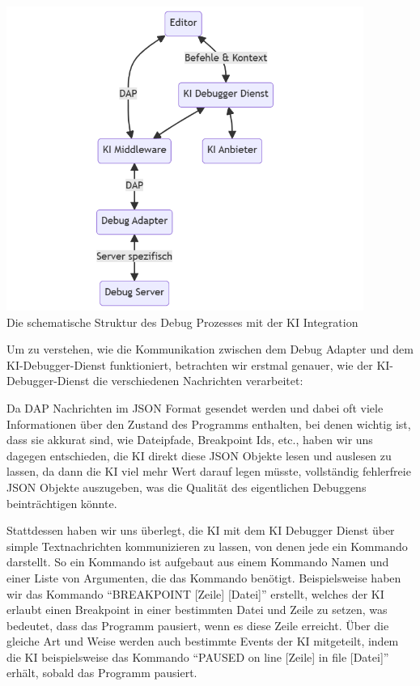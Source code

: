 \documentclass[a4paper,12pt,ngerman]{scrartcl}
\begin{document}
\begin{center}	
	\includegraphics[width=0.875\textwidth]{ai_integration}\\
	\small{Die schematische Struktur des Debug Prozesses mit der KI Integration}
\end{center}

Um zu verstehen, wie die Kommunikation zwischen dem Debug Adapter und dem KI-Debugger-Dienst funktioniert, betrachten wir erstmal genauer, wie der KI-Debugger-Dienst die verschiedenen Nachrichten verarbeitet:

Da DAP Nachrichten im JSON Format gesendet werden und dabei oft viele Informationen über den Zustand des Programms enthalten, bei denen wichtig ist, dass sie akkurat sind, wie Dateipfade, Breakpoint Ids, etc., haben wir uns dagegen entschieden, die KI direkt diese JSON Objekte lesen und auslesen zu lassen, da dann die KI viel mehr Wert darauf legen müsste, vollständig fehlerfreie JSON Objekte auszugeben, was die Qualität des eigentlichen Debuggens beinträchtigen könnte.

Stattdessen haben wir uns überlegt, die KI mit dem KI Debugger Dienst über simple Textnachrichten kommunizieren zu lassen, von denen jede ein Kommando darstellt. So ein Kommando ist aufgebaut aus einem Kommando Namen und einer Liste von Argumenten, die das Kommando benötigt. Beispielsweise haben wir das Kommando ``BREAKPOINT [Zeile] [Datei]'' erstellt, welches der KI erlaubt einen Breakpoint in einer bestimmten Datei und Zeile zu setzen, was bedeutet, dass das Programm pausiert, wenn es diese Zeile erreicht. Über die gleiche Art und Weise werden auch bestimmte Events der KI mitgeteilt, indem die KI beispielsweise das Kommando ``PAUSED on line [Zeile] in file [Datei]'' erhält, sobald das Programm pausiert.
\end{document}
